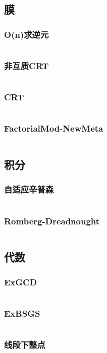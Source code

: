 \subsection{膜}
\subsubsection{O(n)求逆元}
\inputminted[breaklines]{cpp}{math/mod/inv.cpp}
\subsubsection{非互质CRT}
\inputminted[breaklines]{cpp}{math/mod/not-coprime-CRT.cpp}
\subsubsection{CRT}
\inputminted[breaklines]{cpp}{math/mod/CRT.cpp}
\subsubsection{FactorialMod-NewMeta}
\inputminted[breaklines]{cpp}{math/mod/FactorialMod-NewMeta.cpp}

\subsection{积分}
\subsubsection{自适应辛普森}
\inputminted[breaklines]{cpp}{math/integral/Simpson.cpp}
\subsubsection{Romberg-Dreadnought}
\inputminted[breaklines]{cpp}{math/integral/Romberg-Dreadnought.cpp}

\subsection{代数}
\subsubsection{ExGCD}
\inputminted[breaklines]{cpp}{math/algebra/EX-GCD.cpp}
\subsubsection{ExBSGS}
\inputminted[breaklines]{cpp}{math/algebra/EX-BSGS.cpp}
\subsubsection{线段下整点}
\inputminted[breaklines]{cpp}{math/algebra/integer-lattice-under-segment.cpp}
